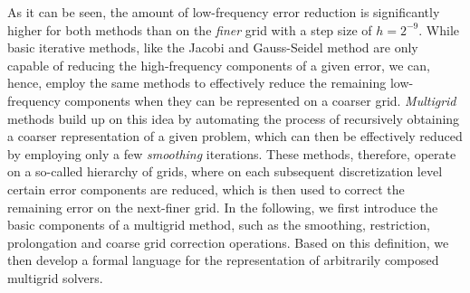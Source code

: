 As it can be seen, the amount of low-frequency error reduction is significantly higher for both methods than on the \emph{finer} grid with a step size of $h = 2^{-9}$.
While basic iterative methods, like the Jacobi and Gauss-Seidel method are only capable of reducing the high-frequency components of a given error, we can, hence, employ the same methods to effectively reduce the remaining low-frequency components when they can be represented on a coarser grid.
\emph{Multigrid} methods build up on this idea by automating the process of recursively obtaining a coarser representation of a given problem, which can then be effectively reduced by employing only a few \emph{smoothing} iterations.
These methods, therefore, operate on a so-called hierarchy of grids, where on each subsequent discretization level certain error components are reduced, which is then used to correct the remaining error on the next-finer grid.
In the following, we first introduce the basic components of a multigrid method, such as the smoothing, restriction, prolongation and coarse grid correction operations.
Based on this definition, we then develop a formal language for the representation of arbitrarily composed multigrid solvers.
